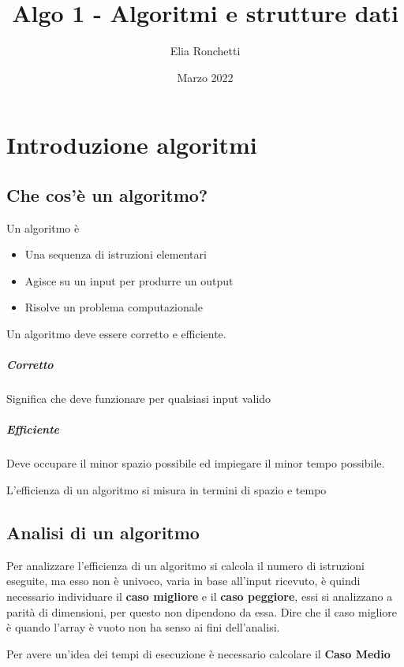 \documentclass[12pt, a4paper, openany]{book}
\begin{document}
\title{Algo 1 - Algoritmi e strutture dati}
\author{Elia Ronchetti}
\date{Marzo 2022}

\maketitle
\tableofcontents

\chapter{Introduzione algoritmi}
\section{Che cos'è un algoritmo?}
Un algoritmo è
\begin{itemize}
    \item Una sequenza di istruzioni elementari 
    \item Agisce su un input per produrre un output
    \item Risolve un problema computazionale
\end{itemize}

Un algoritmo deve essere corretto e efficiente.

\paragraph{Corretto} Significa che deve funzionare per qualsiasi input valido
\paragraph{Efficiente} Deve occupare il minor spazio possibile ed impiegare il minor tempo possibile.

L'efficienza di un algoritmo si misura in termini di spazio e tempo

\section{Analisi di un algoritmo}
Per analizzare l'efficienza di un algoritmo si calcola il numero di istruzioni eseguite, ma esso non è univoco, varia in base all'input ricevuto, 
è quindi necessario individuare il \textbf{caso migliore} e il \textbf{caso peggiore}, essi si analizzano a parità di dimensioni, per questo non dipendono da essa.
Dire che il caso migliore è quando l'array è vuoto non ha senso ai fini dell'analisi.

Per avere un'idea dei tempi di esecuzione è necessario calcolare il \textbf{Caso Medio}
\end{document}
